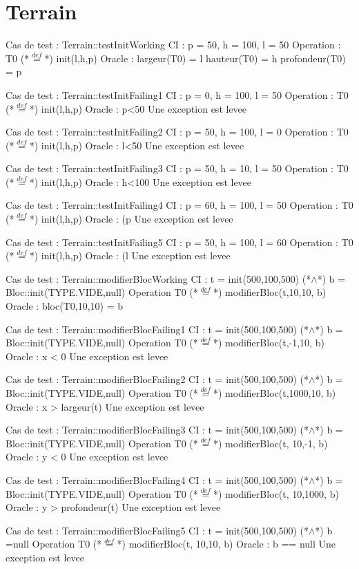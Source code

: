 \documentclass[a4paper, 11pt, notitlepage]{report}
\begin{document}
\section*{Terrain}
\begin{Test}
Cas de test  : Terrain::testInitWorking
CI : p = 50, h = 100, l = 50
Operation : T0 (*$\stackrel{def}{=}$*) init(l,h,p)
Oracle :
	largeur(T0) = l
	hauteur(T0) = h
	profondeur(T0) = p

Cas de test  : Terrain::testInitFailing1
CI :  p = 0, h = 100, l = 50
Operation : T0 (*$\stackrel{def}{=}$*) init(l,h,p)
Oracle :
	p<50
	Une exception est levee

Cas de test  : Terrain::testInitFailing2
CI :  p = 50, h = 100, l = 0
Operation : T0 (*$\stackrel{def}{=}$*) init(l,h,p)
Oracle :
	l<50
	Une exception est levee

Cas de test  : Terrain::testInitFailing3
CI :  p = 50, h = 10, l = 50
Operation : T0 (*$\stackrel{def}{=}$*) init(l,h,p)
Oracle :
	h<100
	Une exception est levee

Cas de test  : Terrain::testInitFailing4
CI :  p = 60, h = 100, l = 50
Operation : T0 (*$\stackrel{def}{=}$*) init(l,h,p)
Oracle :
	(p%
	Une exception est levee

Cas de test  : Terrain::testInitFailing5
CI :  p = 50, h = 100, l = 60
Operation : T0 (*$\stackrel{def}{=}$*) init(l,h,p)
Oracle :
	(l%
	Une exception est levee

Cas de test : Terrain::modifierBlocWorking
CI : t = init(500,100,500) (*$\land$*) b = Bloc::init(TYPE.VIDE,null)
Operation T0 (*$\stackrel{def}{=}$*) modifierBloc(t,10,10, b)
Oracle :
	bloc(T0,10,10) = b

Cas de test : Terrain::modifierBlocFailing1
CI : t = init(500,100,500) (*$\land$*) b = Bloc::init(TYPE.VIDE,null)
Operation T0 (*$\stackrel{def}{=}$*) modifierBloc(t,-1,10, b)
Oracle :
	x < 0
	Une exception est levee

Cas de test : Terrain::modifierBlocFailing2
CI : t = init(500,100,500) (*$\land$*) b = Bloc::init(TYPE.VIDE,null)
Operation T0 (*$\stackrel{def}{=}$*) modifierBloc(t,1000,10, b)
Oracle :
	x > largeur(t)
	Une exception est levee

Cas de test : Terrain::modifierBlocFailing3
CI : t = init(500,100,500) (*$\land$*) b = Bloc::init(TYPE.VIDE,null)
Operation T0 (*$\stackrel{def}{=}$*) modifierBloc(t, 10,-1, b)
Oracle :
	y < 0
	Une exception est levee 
 
Cas de test : Terrain::modifierBlocFailing4
CI : t = init(500,100,500) (*$\land$*) b = Bloc::init(TYPE.VIDE,null)
Operation T0 (*$\stackrel{def}{=}$*) modifierBloc(t, 10,1000, b)
Oracle :
	y > profondeur(t)
	Une exception est levee 

Cas de test : Terrain::modifierBlocFailing5
CI : t = init(500,100,500) (*$\land$*) b =null
Operation T0 (*$\stackrel{def}{=}$*) modifierBloc(t, 10,10, b)
Oracle :
	b == null
	Une exception est levee 

	    
\end{Test}


	
\end{document}
